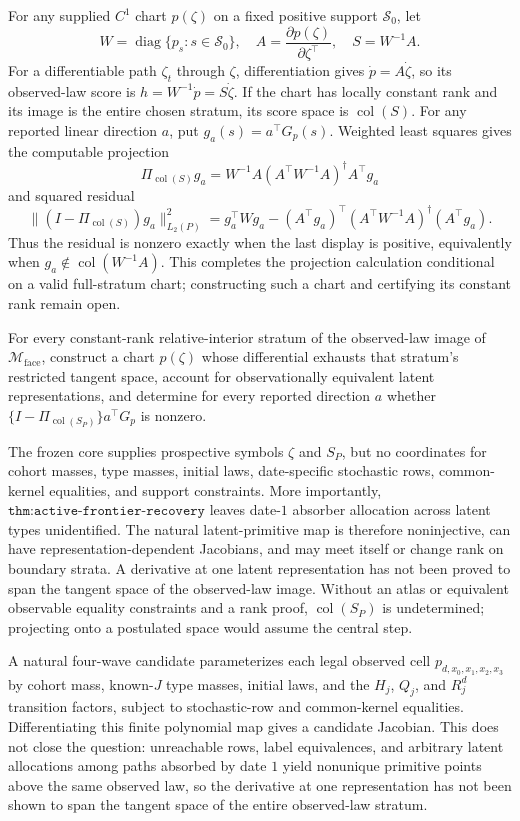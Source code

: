 For any supplied \(C^1\) chart \(p(\zeta)\) on a fixed positive support \(\mathcal S_0\), let
\[
 W=\operatorname{diag}\{p_s:s\in\mathcal S_0\},\quad
 A=\frac{\partial p(\zeta)}{\partial\zeta^\top},\quad
 S=W^{-1}A.
\]
For a differentiable path \(\zeta_t\) through \(\zeta\), differentiation gives \(\dot p=A\dot\zeta\), so its observed-law score is \(h=W^{-1}\dot p=S\dot\zeta\).  If the chart has locally constant rank and its image is the entire chosen stratum, its score space is \(\operatorname{col}(S)\).  For any reported linear direction \(a\), put \(g_a(s)=a^\top G_p(s)\).  Weighted least squares gives the computable projection
\[
 \Pi_{\operatorname{col}(S)}g_a
 =W^{-1}A(A^\top W^{-1}A)^\dagger A^\top g_a
\]
and squared residual
\[
 \|(I-\Pi_{\operatorname{col}(S)})g_a\|_{L_2(P)}^2
 =g_a^\top Wg_a-(A^\top g_a)^\top
 (A^\top W^{-1}A)^\dagger(A^\top g_a).
\]
Thus the residual is nonzero exactly when the last display is positive, equivalently when \(g_a\notin\operatorname{col}(W^{-1}A)\).  This completes the projection calculation conditional on a valid full-stratum chart; constructing such a chart and certifying its constant rank remain open.

For every constant-rank relative-interior stratum of the observed-law image of \(\mathcal M_{\mathrm{face}}\), construct a chart \(p(\zeta)\) whose differential exhausts that stratum's restricted tangent space, account for observationally equivalent latent representations, and determine for every reported direction \(a\) whether \(\{I-\Pi_{\operatorname{col}(S_P)}\}a^\top G_p\) is nonzero.

The frozen core supplies prospective symbols \(\zeta\) and \(S_P\), but no coordinates for cohort masses, type masses, initial laws, date-specific stochastic rows, common-kernel equalities, and support constraints.  More importantly, \(\texttt{thm:active-frontier-recovery}\) leaves date-\(1\) absorber allocation across latent types unidentified.  The natural latent-primitive map is therefore noninjective, can have representation-dependent Jacobians, and may meet itself or change rank on boundary strata.  A derivative at one latent representation has not been proved to span the tangent space of the observed-law image.  Without an atlas or equivalent observable equality constraints and a rank proof, \(\operatorname{col}(S_P)\) is undetermined; projecting onto a postulated space would assume the central step.

A natural four-wave candidate parameterizes each legal observed cell \(p_{d,x_0,x_1,x_2,x_3}\) by cohort mass, known-\(J\) type masses, initial laws, and the \(H_j\), \(Q_j\), and \(R_j^d\) transition factors, subject to stochastic-row and common-kernel equalities.  Differentiating this finite polynomial map gives a candidate Jacobian.  This does not close the question: unreachable rows, label equivalences, and arbitrary latent allocations among paths absorbed by date \(1\) yield nonunique primitive points above the same observed law, so the derivative at one representation has not been shown to span the tangent space of the entire observed-law stratum.

